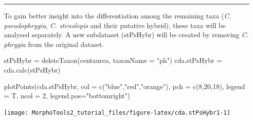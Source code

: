 \documentclass[
  11pt,
  a4paper]{article}
\newenvironment{Shaded}{\begin{snugshade}}{\end{snugshade}}
\newcommand{\AttributeTok}[1]{\textcolor[rgb]{0.77,0.63,0.00}{#1}}
\newcommand{\DecValTok}[1]{\textcolor[rgb]{0.00,0.00,0.81}{#1}}
\newcommand{\FunctionTok}[1]{\textcolor[rgb]{0.00,0.00,0.00}{#1}}
\newcommand{\NormalTok}[1]{#1}
\newcommand{\OtherTok}[1]{\textcolor[rgb]{0.56,0.35,0.01}{#1}}
\newcommand{\StringTok}[1]{\textcolor[rgb]{0.31,0.60,0.02}{#1}}
\begin{document}
\begin{center}\rule{0.5\linewidth}{0.5pt}\end{center}

To gain better insight into the differentiation among the remaining taxa
(\emph{C. pseudophrygia}, \emph{C. stenolepis} and their putative
hybrid), these taxa will be analysed separately. A new subdataset
(stPsHybr) will be created by removing \emph{C. phrygia} from the
original dataset.

\begin{Shaded}
\begin{Highlighting}[]
\NormalTok{stPsHybr }\OtherTok{=} \FunctionTok{deleteTaxon}\NormalTok{(centaurea, }\AttributeTok{taxonName =} \StringTok{"ph"}\NormalTok{)}
\NormalTok{cda.stPsHybr }\OtherTok{=} \FunctionTok{cda.calc}\NormalTok{(stPsHybr)}
\end{Highlighting}
\end{Shaded}

\vspace{-0.9cm}

\begin{Shaded}
\begin{Highlighting}[]
\FunctionTok{plotPoints}\NormalTok{(cda.stPsHybr, }\AttributeTok{col =} \FunctionTok{c}\NormalTok{(}\StringTok{"blue"}\NormalTok{,}\StringTok{"red"}\NormalTok{,}\StringTok{"orange"}\NormalTok{), }\AttributeTok{pch =} \FunctionTok{c}\NormalTok{(}\DecValTok{8}\NormalTok{,}\DecValTok{20}\NormalTok{,}\DecValTok{18}\NormalTok{), }
            \AttributeTok{legend =}\NormalTok{ T, }\AttributeTok{ncol =} \DecValTok{2}\NormalTok{, }\AttributeTok{legend.pos=}\StringTok{"bottomright"}\NormalTok{)}
\end{Highlighting}
\end{Shaded}

\begin{center}\texttt{[image: MorphoTools2\_tutorial\_files/figure-latex/cda.stPsHybr1-1]} \end{center}
\end{document}
